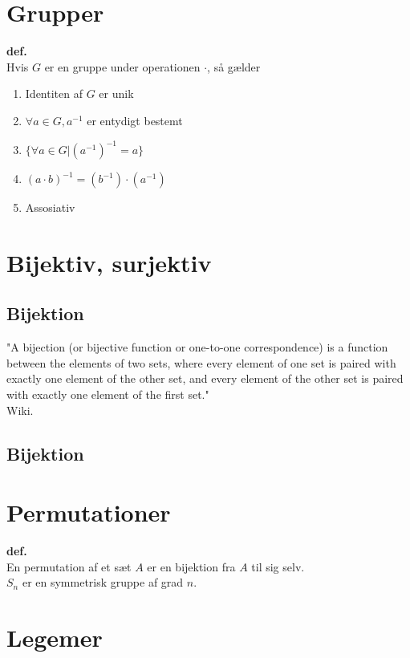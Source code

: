 \documentclass{article}
\begin{document}
\section*{Grupper}
\textbf{def.}\\
Hvis $G$ er en gruppe under operationen $\cdot$, så gælder
\begin{enumerate}
\item Identiten af $G$ er unik
\item $\forall{a} \in G, a^{-1}$ er entydigt bestemt
\item $\{ \forall{a} \in G | (a^{-1})^{-1} = a\}$
\item $(a \cdot b)^{-1} = (b^{-1}) \cdot (a^{-1})$
\item Assosiativ
\end{enumerate}

\section*{Bijektiv, surjektiv}
\subsection*{Bijektion}
"A bijection (or bijective function or one-to-one correspondence) is a function between the elements of two sets, where every element of one set is paired with exactly one element of the other set, and every element of the other set is paired with exactly one element of the first set."\\
Wiki.
\subsection*{Bijektion}

\section*{Permutationer}
\textbf{def.}\\
En permutation af et sæt $A$ er en bijektion fra $A$ til sig selv.\\
$S_n$ er en symmetrisk gruppe af grad $n$.

\section*{Legemer}
\end{document}
